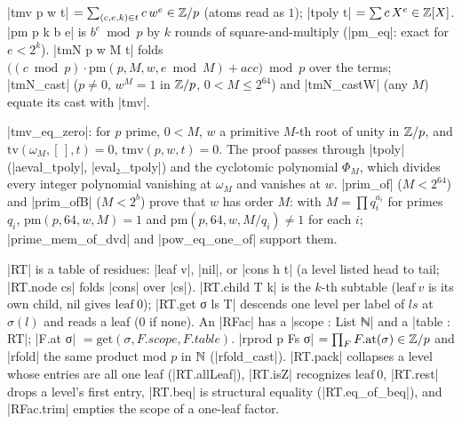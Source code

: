\begin{definition}[Residues]\label{def:lean-core-tmv}
\lean|tmv p w t| $=\sum_{(c,e,k)\in t}c\,w^e\in\mathbb{Z}/p$ (atoms read as $1$); \lean|tpoly t| $=\sum c\,X^e\in\mathbb{Z}[X]$. \lean|pm p k b e| is $b^e\bmod p$ by $k$ rounds of square-and-multiply (\lean|pm_eq|: exact for $e<2^k$). \lean|tmN p w M t| folds $\bigl((c\bmod p)\cdot\mathrm{pm}(p,M,w,e\bmod M)+\mathit{acc}\bigr)\bmod p$ over the terms; \lean|tmN_cast| ($p\ne0$, $w^M=1$ in $\mathbb{Z}/p$, $0<M\le 2^{64}$) and \lean|tmN_castW| (any $M$) equate its cast with \lean|tmv|.
\end{definition}

\begin{theorem}\label{thm:lean-core-tmv-zero}
\lean|tmv_eq_zero|: for $p$ prime, $0<M$, $w$ a primitive $M$-th root of unity in $\mathbb{Z}/p$, and $\mathrm{tv}(\omega_M,[\,],t)=0$, $\mathrm{tmv}(p,w,t)=0$. The proof passes through \lean|tpoly| (\lean|aeval_tpoly|, \lean|eval₂_tpoly|) and the cyclotomic polynomial $\Phi_M$, which divides every integer polynomial vanishing at $\omega_M$ and vanishes at $w$. \lean|prim_of| ($M<2^{64}$) and \lean|prim_ofB| ($M<2^b$) prove that $w$ has order $M$: with $M=\prod q_i^{a_i}$ for primes $q_i$, $\mathrm{pm}(p,64,w,M)=1$ and $\mathrm{pm}(p,64,w,M/q_i)\ne1$ for each $i$; \lean|prime_mem_of_dvd| and \lean|pow_eq_one_of| support them.
\end{theorem}

\begin{definition}\label{def:lean-core-RT}
\lean|RT| is a table of residues: \lean|leaf v|, \lean|nil|, or \lean|cons h t| (a level listed head to tail; \lean|RT.node cs| folds \lean|cons| over \lean|cs|). \lean|RT.child T k| is the $k$-th subtable ($\mathrm{leaf}\ v$ is its own child, $\mathrm{nil}$ gives $\mathrm{leaf}\ 0$); \lean|RT.get σ ls T| descends one level per label of $ls$ at $\sigma(l)$ and reads a leaf ($0$ if none). An \lean|RFac| has a \lean|scope : List ℕ| and a \lean|table : RT|; \lean|F.at σ| $=\mathrm{get}(\sigma,F.\mathit{scope},F.\mathit{table})$. \lean|rprod p Fs σ| $=\prod_F F.\mathrm{at}(\sigma)\in\mathbb{Z}/p$ and \lean|rfold| the same product mod $p$ in $\mathbb{N}$ (\lean|rfold_cast|). \lean|RT.pack| collapses a level whose entries are all one leaf (\lean|RT.allLeaf|), \lean|RT.isZ| recognizes $\mathrm{leaf}\ 0$, \lean|RT.rest| drops a level's first entry, \lean|RT.beq| is structural equality (\lean|RT.eq_of_beq|), and \lean|RFac.trim| empties the scope of a one-leaf factor.
\end{definition}

